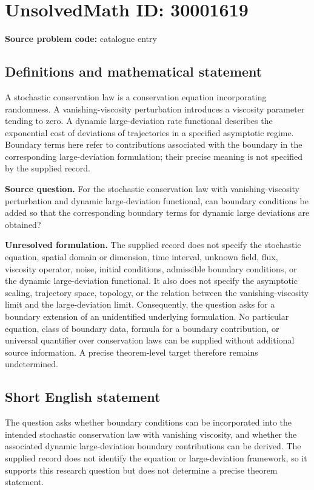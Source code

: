 \documentclass[11pt]{article}
\begin{document}
\section*{UnsolvedMath ID: 30001619}
\textbf{Source problem code:} catalogue entry
\subsection{Definitions and mathematical statement}
A stochastic conservation law is a conservation equation incorporating randomness. A vanishing-viscosity perturbation introduces a viscosity parameter tending to zero. A dynamic large-deviation rate functional describes the exponential cost of deviations of trajectories in a specified asymptotic regime. Boundary terms here refer to contributions associated with the boundary in the corresponding large-deviation formulation; their precise meaning is not specified by the supplied record.

\textbf{Source question.} For the stochastic conservation law with vanishing-viscosity perturbation and dynamic large-deviation functional, can boundary conditions be added so that the corresponding boundary terms for dynamic large deviations are obtained?

\textbf{Unresolved formulation.} The supplied record does not specify the stochastic equation, spatial domain or dimension, time interval, unknown field, flux, viscosity operator, noise, initial conditions, admissible boundary conditions, or the dynamic large-deviation functional. It also does not specify the asymptotic scaling, trajectory space, topology, or the relation between the vanishing-viscosity limit and the large-deviation limit. Consequently, the question asks for a boundary extension of an unidentified underlying formulation. No particular equation, class of boundary data, formula for a boundary contribution, or universal quantifier over conservation laws can be supplied without additional source information. A precise theorem-level target therefore remains undetermined.
\subsection{Short English statement}
The question asks whether boundary conditions can be incorporated into the intended stochastic conservation law with vanishing viscosity, and whether the associated dynamic large-deviation boundary contributions can be derived. The supplied record does not identify the equation or large-deviation framework, so it supports this research question but does not determine a precise theorem statement.
\end{document}
